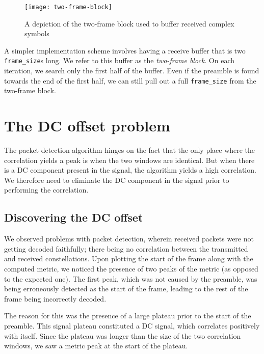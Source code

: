 \begin{figure}[h]
	\centering
	\texttt{[image: two-frame-block]}
	\caption{A depiction of the two-frame block used to buffer received complex
	         symbols}
	\label{fig:two-frame-block}
\end{figure}

A simpler implementation scheme involves having a receive buffer that is two
\verb+frame_size+s long. We refer to this buffer as the \emph{two-frame block}.
On each iteration, we search only the first half of the buffer. Even if the
preamble is found towards the end of the first half, we can still pull out a
full \verb+frame_size+ from the two-frame block.


\section{The DC offset problem}

The packet detection algorithm hinges on the fact that the only place where
the correlation yields a peak is when the two windows are identical. But when
there is a DC component present in the signal, the algorithm yields a high
correlation. We therefore need to eliminate the DC component in the signal
prior to performing the correlation.

\subsection{Discovering the DC offset}

We observed problems with packet detection, wherein received packets were not
getting decoded faithfully; there being no correlation between the transmitted
and received constellations. Upon plotting the start of the frame along with
the computed metric, we noticed the presence of two peaks of the metric (as
opposed to the expected one). The first peak, which was not caused by the
preamble, was being erroneously detected as the start of the frame, leading to
the rest of the frame being incorrectly decoded.

The reason for this was the presence of a large plateau prior to the start of
the preamble. This signal plateau constituted a DC signal, which correlates
positively with itself. Since the plateau was longer than the size of the two
correlation windows, we saw a metric peak at the start of the plateau.

